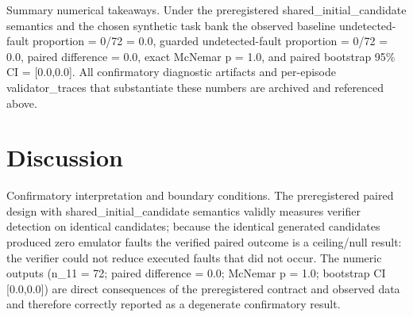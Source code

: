 \documentclass[conference]{IEEEtran}
\begin{document}
Summary numerical takeaways. Under the preregistered shared\_initial\_candidate semantics and the chosen synthetic task bank the observed baseline undetected-fault proportion = 0/72 = 0.0, guarded undetected-fault proportion = 0/72 = 0.0, paired difference = 0.0, exact McNemar p = 1.0, and paired bootstrap 95\% CI = [0.0,0.0]. All confirmatory diagnostic artifacts and per-episode validator\_traces that substantiate these numbers are archived and referenced above.

\section{Discussion}
Confirmatory interpretation and boundary conditions. The preregistered paired design with shared\_initial\_candidate semantics validly measures verifier detection on identical candidates; because the identical generated candidates produced zero emulator faults the verified paired outcome is a ceiling/null result: the verifier could not reduce executed faults that did not occur. The numeric outputs (n\_11 = 72; paired difference = 0.0; McNemar p = 1.0; bootstrap CI [0.0,0.0]) are direct consequences of the preregistered contract and observed data and therefore correctly reported as a degenerate confirmatory result.
\end{document}
